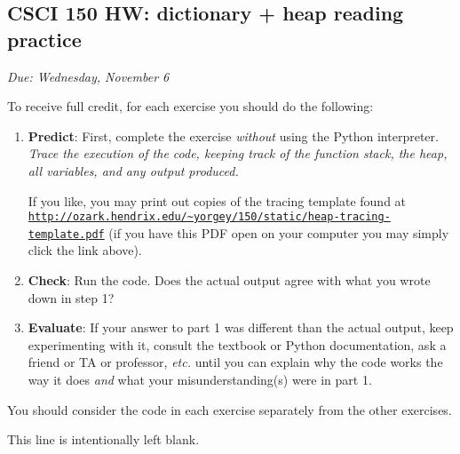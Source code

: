 \documentclass[]{article}
\date{}
\begin{document}
\hypertarget{csci-150-hw-dictionary-heap-reading-practice}{%
\subsection{CSCI 150 HW: dictionary + heap reading
practice}\label{csci-150-hw-dictionary-heap-reading-practice}}

\emph{Due: Wednesday, November 6}

To receive full credit, for each exercise you should do the following:

\begin{enumerate}
\def\labelenumi{\arabic{enumi}.}
\item
  \textbf{Predict}: First, complete the exercise \emph{without} using
  the Python interpreter. \emph{Trace the execution of the code, keeping
  track of the function stack, the heap, all variables, and any output
  produced.}

  If you like, you may print out copies of the tracing template found at
  \href{http://ozark.hendrix.edu/~yorgey/150/static/heap-tracing-template.pdf}{\texttt{http://ozark.hendrix.edu/\textasciitilde{}yorgey/150/static/heap-tracing-template.pdf}}
  (if you have this PDF open on your computer you may simply click the
  link above).
\item
  \textbf{Check}: Run the code. Does the actual output agree with what
  you wrote down in step 1?
\item
  \textbf{Evaluate}: If your answer to part 1 was different than the
  actual output, keep experimenting with it, consult the textbook or
  Python documentation, ask a friend or TA or professor, \emph{etc.}
  until you can explain why the code works the way it does \emph{and}
  what your misunderstanding(s) were in part 1.
\end{enumerate}

You should consider the code in each exercise separately from the other
exercises.

This line is intentionally left blank.
\end{document}
